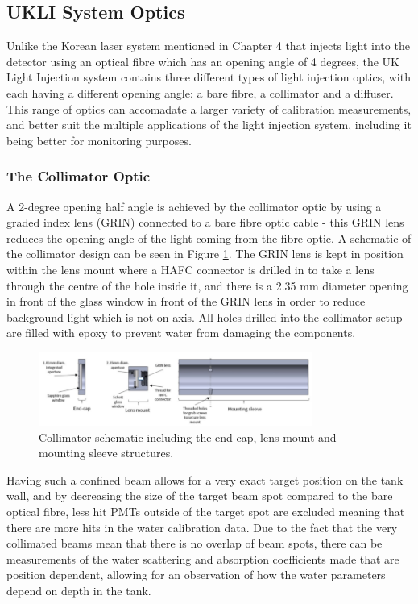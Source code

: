 \subsection{UKLI System Optics}

Unlike the Korean laser system mentioned in Chapter 4 that injects light into the detector using an optical fibre which has an opening angle of 4 degrees, the UK Light Injection system contains three different types of light injection optics, with each having a different opening angle: a bare fibre, a collimator and a diffuser. This range of optics can accomadate a larger variety of calibration measurements, and better suit the multiple applications of the light injection system, including it being better for monitoring purposes. 

\subsubsection{The Collimator Optic}

A 2-degree opening half angle is achieved by the collimator optic by using a graded index lens (GRIN) connected to a bare fibre optic cable - this GRIN lens reduces the opening angle of the light coming from the fibre optic. A schematic of the collimator design can be seen in Figure \ref{fig:collimator_schematic}. The GRIN lens is kept in position within the lens mount where a HAFC connector is drilled in to take a lens through the centre of the hole inside it, and there is a 2.35 mm diameter opening in front of the glass window in front of the GRIN lens in order to reduce background light which is not on-axis. All holes drilled into the collimator setup are filled with epoxy to prevent water from damaging the components. 

\begin{figure}
    \centering
    \includegraphics[width=0.8\textwidth]{Figures/collimator_schematic.png}
    \caption{Collimator schematic including the end-cap, lens mount and mounting sleeve structures.}
    \label{fig:collimator_schematic}
\end{figure}

Having such a confined beam allows for a very exact target position on the tank wall, and by decreasing the size of the target beam spot compared to the bare optical fibre, less hit PMTs outside of the target spot are excluded meaning that there are more hits in the water calibration data. Due to the fact that the very collimated beams mean that there is no overlap of beam spots, there can be measurements of the water scattering and absorption coefficients made that are position dependent, allowing for an observation of how the water parameters depend on depth in the tank. 

